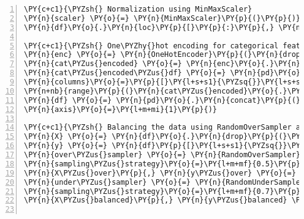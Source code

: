 \documentclass[12pt]{article}
\begin{document}
\begin{Verbatim}[commandchars=\\\{\},numbers=left,firstnumber=1,stepnumber=1,formatcom=\footnotesize]
\PY{c+c1}{\PYZsh{} Normalization using MinMaxScaler}
\PY{n}{scaler} \PY{o}{=} \PY{n}{MinMaxScaler}\PY{p}{(}\PY{p}{)}
\PY{n}{df}\PY{o}{.}\PY{n}{loc}\PY{p}{[}\PY{p}{:}\PY{p}{,} \PY{n}{num\PYZus{}features}\PY{p}{]} \PY{o}{=} \PY{n}{scaler}\PY{o}{.}\PY{n}{fit\PYZus{}transform}\PY{p}{(}\PY{n}{df}\PY{p}{[}\PY{n}{num\PYZus{}features}\PY{p}{]}\PY{p}{)}

\PY{c+c1}{\PYZsh{} One\PYZhy{}hot encoding for categorical features}
\PY{n}{enc} \PY{o}{=} \PY{n}{OneHotEncoder}\PY{p}{(}\PY{n}{drop}\PY{o}{=}\PY{l+s+s1}{\PYZsq{}}\PY{l+s+s1}{first}\PY{l+s+s1}{\PYZsq{}}\PY{p}{,} \PY{n}{sparse}\PY{o}{=}\PY{k+kc}{False}\PY{p}{)}
\PY{n}{cat\PYZus{}encoded} \PY{o}{=} \PY{n}{enc}\PY{o}{.}\PY{n}{fit\PYZus{}transform}\PY{p}{(}\PY{n}{df}\PY{p}{[}\PY{p}{[}\PY{l+s+s1}{\PYZsq{}}\PY{l+s+s1}{Education}\PY{l+s+s1}{\PYZsq{}}\PY{p}{]}\PY{p}{]}\PY{p}{)}
\PY{n}{cat\PYZus{}encoded\PYZus{}df} \PY{o}{=} \PY{n}{pd}\PY{o}{.}\PY{n}{DataFrame}\PY{p}{(}\PY{n}{cat\PYZus{}encoded}\PY{p}{,} \PYZbs{}
\PY{n}{columns}\PY{o}{=}\PY{p}{[}\PY{l+s+s1}{\PYZsq{}}\PY{l+s+s1}{Education\PYZus{}}\PY{l+s+s1}{\PYZsq{}}\PY{o}{+}\PY{n+nb}{str}\PY{p}{(}\PY{n+nb}{int}\PY{p}{(}\PY{n}{i}\PY{p}{)}\PY{p}{)} \PY{k}{for} \PY{n}{i} \PY{o+ow}{in} \PYZbs{}
\PY{n+nb}{range}\PY{p}{(}\PY{n}{cat\PYZus{}encoded}\PY{o}{.}\PY{n}{shape}\PY{p}{[}\PY{l+m+mi}{1}\PY{p}{]}\PY{p}{)}\PY{p}{]}\PY{p}{)}
\PY{n}{df} \PY{o}{=} \PY{n}{pd}\PY{o}{.}\PY{n}{concat}\PY{p}{(}\PY{p}{[}\PY{n}{df}\PY{o}{.}\PY{n}{drop}\PY{p}{(}\PY{p}{[}\PY{l+s+s1}{\PYZsq{}}\PY{l+s+s1}{Education}\PY{l+s+s1}{\PYZsq{}}\PY{p}{]}\PY{p}{,} \PY{n}{axis}\PY{o}{=}\PY{l+m+mi}{1}\PY{p}{)}\PY{p}{,} \PY{n}{cat\PYZus{}encoded\PYZus{}df}\PY{p}{]}\PY{p}{,} \PYZbs{}
\PY{n}{axis}\PY{o}{=}\PY{l+m+mi}{1}\PY{p}{)}

\PY{c+c1}{\PYZsh{} Balancing the data using RandomOverSampler and RandomUnderSampler}
\PY{n}{X} \PY{o}{=} \PY{n}{df}\PY{o}{.}\PY{n}{drop}\PY{p}{(}\PY{l+s+s1}{\PYZsq{}}\PY{l+s+s1}{Diabetes\PYZus{}binary}\PY{l+s+s1}{\PYZsq{}}\PY{p}{,} \PY{n}{axis}\PY{o}{=}\PY{l+m+mi}{1}\PY{p}{)}
\PY{n}{y} \PY{o}{=} \PY{n}{df}\PY{p}{[}\PY{l+s+s1}{\PYZsq{}}\PY{l+s+s1}{Diabetes\PYZus{}binary}\PY{l+s+s1}{\PYZsq{}}\PY{p}{]}
\PY{n}{over\PYZus{}sampler} \PY{o}{=} \PY{n}{RandomOverSampler}\PY{p}{(}\PY{n}{random\PYZus{}state}\PY{o}{=}\PY{l+m+mi}{0}\PY{p}{,} \PYZbs{}
\PY{n}{sampling\PYZus{}strategy}\PY{o}{=}\PY{l+m+mf}{0.5}\PY{p}{)}
\PY{n}{X\PYZus{}over}\PY{p}{,} \PY{n}{y\PYZus{}over} \PY{o}{=} \PY{n}{over\PYZus{}sampler}\PY{o}{.}\PY{n}{fit\PYZus{}resample}\PY{p}{(}\PY{n}{X}\PY{p}{,} \PY{n}{y}\PY{p}{)}
\PY{n}{under\PYZus{}sampler} \PY{o}{=} \PY{n}{RandomUnderSampler}\PY{p}{(}\PY{n}{random\PYZus{}state}\PY{o}{=}\PY{l+m+mi}{0}\PY{p}{,} \PYZbs{}
\PY{n}{sampling\PYZus{}strategy}\PY{o}{=}\PY{l+m+mf}{0.7}\PY{p}{)}
\PY{n}{X\PYZus{}balanced}\PY{p}{,} \PY{n}{y\PYZus{}balanced} \PY{o}{=} \PY{n}{under\PYZus{}sampler}\PY{o}{.}\PY{n}{fit\PYZus{}resample}\PY{p}{(}\PY{n}{X\PYZus{}over}\PY{p}{,} \PY{n}{y\PYZus{}over}\PY{p}{)}


\end{Verbatim}
\end{document}
